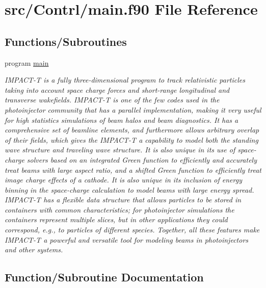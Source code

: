 \hypertarget{main_8f90}{}\section{src/\+Contrl/main.f90 File Reference}
\label{main_8f90}
\subsection*{Functions/\+Subroutines}
\begin{DoxyCompactItemize}
\item 
program \mbox{\hyperlink{main_8f90_a8ec2266d83cd6c0b762cbcbc92c0af3d}{main}}
\begin{DoxyCompactList}\small\item\em I\+M\+P\+A\+C\+T-\/T is a fully three-\/dimensional program to track relativistic particles taking into account space charge forces and short-\/range longitudinal and transverse wakefields. I\+M\+P\+A\+C\+T-\/T is one of the few codes used in the photoinjector community that has a parallel implementation, making it very useful for high statistics simulations of beam halos and beam diagnostics. It has a comprehensive set of beamline elements, and furthermore allows arbitrary overlap of their fields, which gives the I\+M\+P\+A\+C\+T-\/T a capability to model both the standing wave structure and traveling wave structure. It is also unique in its use of space-\/charge solvers based on an integrated Green function to efficiently and accurately treat beams with large aspect ratio, and a shifted Green function to efficiently treat image charge effects of a cathode. It is also unique in its inclusion of energy binning in the space-\/charge calculation to model beams with large energy spread. I\+M\+P\+A\+C\+T-\/T has a flexible data structure that allows particles to be stored in containers with common characteristics; for photoinjector simulations the containers represent multiple slices, but in other applications they could correspond, e.\+g., to particles of different species. Together, all these features make I\+M\+P\+A\+C\+T-\/T a powerful and versatile tool for modeling beams in photoinjectors and other systems. \end{DoxyCompactList}\end{DoxyCompactItemize}


\subsection{Function/\+Subroutine Documentation}
\mbox{\label{main_8f90_a8ec2266d83cd6c0b762cbcbc92c0af3d}} 
